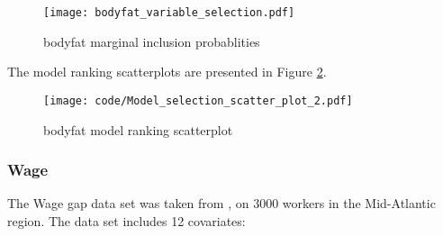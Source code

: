 \documentclass{amsart}[12pt]
\begin{document}
\begin{figure}[p]
	\texttt{[image: bodyfat\_variable\_selection.pdf]}
	\caption{bodyfat marginal inclusion probablities}
	\label{fig:bodyfat_inclusion}
\end{figure}

The model ranking scatterplots are presented in Figure \ref{fig:bodyfat_model_ranking}.

\begin{figure}[p]
	\texttt{[image: code/Model\_selection\_scatter\_plot\_2.pdf]}
	\caption{bodyfat model ranking scatterplot}
	\label{fig:bodyfat_model_ranking}
\end{figure}

\subsubsection{Wage}

The Wage gap data set was taken from \citep{James:2014:ISL:2517747}, on 3000 workers in the Mid-Atlantic
region. The data set includes 12 covariates:
\end{document}
